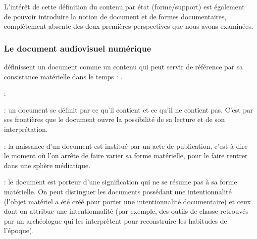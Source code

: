 L'intérêt de cette définition du contenu par état (forme/support) est également de pouvoir introduire la notion de document et de formes documentaires, complètement absente des deux premières perspectives que nous avons examinées.


\subsubsection{Le document audiovisuel numérique}\label{sec:docnum}
\cite{Morizet-mahoudeaux2005a} définissent un document comme un contenu qui peut servir de référence par sa consistance matérielle dans le temps : .

\begin{liste}
	\item {} :  

	\item {} : un document se définit par ce qu'il contient et ce qu'il ne contient pas.
	C'est par ses frontières que le document ouvre la possibilité de sa lecture et de son interprétation.

	\item {} : la naissance d'un document est institué par un acte de publication, c'est-à-dire le moment où l'on arrête de faire varier sa forme matérielle, pour le faire rentrer dans une sphère médiatique.

	\item {} : le document est porteur d'une signification qui ne se résume pas à sa forme matérielle.
	On peut distinguer les documents possédant une intentionnalité  (l'objet matériel a été créé pour porter une intentionnalité documentaire) et ceux dont on attribue une intentionnalité  (par exemple, des outils de chasse retrouvés par un archéologue qui les interprètent pour reconstruire les habitudes de l'époque).
\end{liste}


